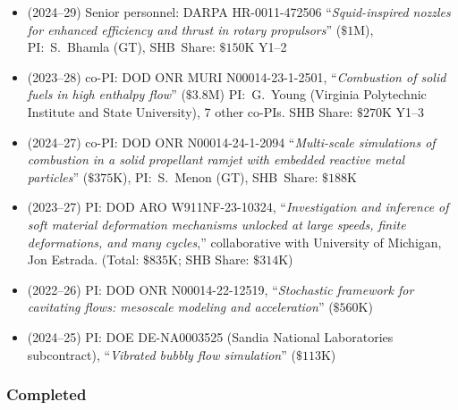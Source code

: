 \begin{itemize}
    \item (2024--29) Senior personnel: DARPA HR-0011-472506 ``\textit{Squid-inspired nozzles for enhanced  efficiency and thrust in rotary propulsors}'' ($\$1$M), PI:~S.~Bhamla (GT), SHB~Share: $\$150$K Y1--2
    \item (2023--28) co-PI: DOD ONR MURI N00014-23-1-2501, ``\textit{Combustion of solid fuels in high enthalpy flow}'' ($\$3.8$M) PI:~G.~Young (Virginia Polytechnic Institute and State University), 7 other co-PIs. SHB Share: $\$270$K Y1--3
    \item (2024--27) co-PI: DOD ONR N00014-24-1-2094 ``\textit{Multi-scale simulations of combustion in a solid propellant ramjet with embedded reactive metal particles}'' ($\$375$K), PI:~S.~Menon (GT), SHB~Share: $\$188$K 
    \item (2023--27) PI: DOD ARO W911NF-23-10324, ``\textit{Investigation and inference of soft material deformation mechanisms unlocked at large speeds, finite deformations, and many cycles},'' collaborative with University of Michigan, Jon Estrada. (Total: $\$835$K; SHB Share: $\$314$K)
    \item (2022--26) PI: DOD ONR N00014-22-12519, ``\textit{Stochastic framework for cavitating flows: mesoscale modeling and acceleration}'' ($\$560$K)
    \item (2024--25) PI: DOE DE-NA0003525 (Sandia National Laboratories subcontract), ``\textit{Vibrated bubbly flow simulation}'' ($\$113$K)
\end{itemize}

\subsubsection{Completed}

